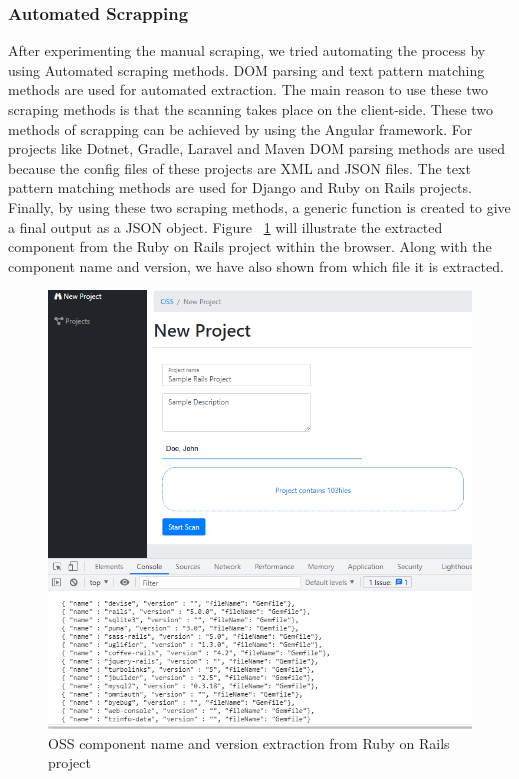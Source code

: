 \subsubsection{Automated Scrapping}
After experimenting the manual scraping, we tried automating the process by using Automated scraping methods. \acs{DOM} parsing and text pattern matching methods are used for automated extraction. The main reason to use these two scraping methods is that the scanning takes place on the client-side. These two methods of scrapping can be achieved by using the Angular framework. For projects like Dotnet, Gradle, Laravel and Maven \acs{DOM} parsing methods are used because the config files of these projects are \acs{XML} and \acs{JSON} files. The text pattern matching methods are used for Django and Ruby on Rails projects. Finally, by using these two scraping methods, a generic function is created to give a final output as a \acs{JSON} object. Figure ~\ref{fig:clientOutput} will illustrate the extracted component from the Ruby on Rails project within the browser. Along with the component name and version, we have also shown from which file it is extracted. 
\newpage
\begin{figure}[H]
	\includegraphics[width=15cm]{includes/clientOutput.PNG}
	\centering
	\caption{\acs{OSS} component name and version extraction from Ruby on Rails project}
	\label{fig:clientOutput}
\end{figure}


